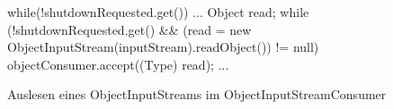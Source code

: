 \begin{figure}[h] 
\vspace{-4px}
    \centering
	\begin{spacing}{0.75}
		\begin{javacode}[firstnumber=56]	
  while(!shutdownRequested.get())
  {
    ...
    Object read;
    while (!shutdownRequested.get() && 
           (read = new ObjectInputStream(inputStream).readObject()) != null)
      objectConsumer.accept((Type) read);
    ...
  }\end{javacode}
	\end{spacing}
	\caption{Auslesen eines ObjectInputStreams im ObjectInputStreamConsumer}
\end{figure}